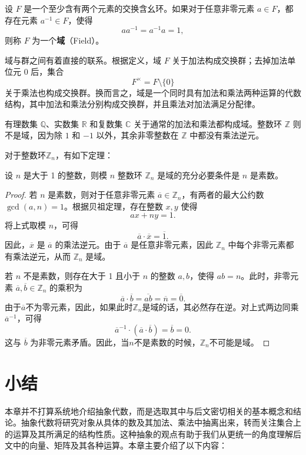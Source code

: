 \begin{definition}[域]
    \label{def_field}
    设 \(F\) 是一个至少含有两个元素的交换含幺环。如果对于任意非零元素 \(a\in F\)，都存在元素 \(a^{-1}\in F\)，使得
    \[
        aa^{-1}=a^{-1}a=1,
    \]
    则称 \(F\) 为一个\textbf{域}（Field）。
\end{definition}

域与群之间有着直接的联系。根据定义，域 \(F\) 关于加法构成交换群；去掉加法单位元 \(0\) 后，集合
\[
    F^\times=F\setminus\{0\}
\]
关于乘法也构成交换群。换而言之，域是一个同时具有加法和乘法两种运算的代数结构，其中加法和乘法分别构成交换群，并且乘法对加法满足分配律。

有理数集 \(\mathbb Q\)、实数集 \(\mathbb R\) 和复数集 \(\mathbb C\) 关于通常的加法和乘法都构成域。整数环 \(\mathbb Z\) 则不是域，因为除 \(1\) 和 \(-1\) 以外，其余非零整数在 \(\mathbb Z\) 中都没有乘法逆元。

对于整数环\( \mathbb{Z}_n \)，有如下定理：
\begin{theorem}
    \label{thm_zn_field_prime}
    设 \(n\) 是大于 1 的整数，则模 \(n\) 整数环 \(\mathbb Z_n\) 是域的充分必要条件是 \(n\) 是素数。
\end{theorem}
\begin{proof}
    若 \(n\) 是素数，则对于任意非零元素 \(\overline a\in\mathbb Z_n\)，有两者的最大公约数 \(\gcd(a,n)=1\)。根据贝祖定理，存在整数 \(x,y\) 使得
    \[
        ax+ny=1.
    \]
    将上式取模 \(n\)，可得
    \[
        \overline{a}\cdot \overline{x}=\overline{1}.
    \]
    因此，\(\overline x\) 是 \(\overline a\) 的乘法逆元。由于 \(\overline a\) 是任意非零元素，因此 \(\mathbb Z_n\) 中每个非零元素都有乘法逆元，从而 \(\mathbb Z_n\) 是域。

    若 \(n\) 不是素数，则存在大于 1 且小于 \(n\) 的整数 \(a,b\)，使得 \(ab=n\)。此时，非零元素 \(\overline a,\overline b\in\mathbb Z_n\) 的乘积为
    \[
        \overline a\cdot \overline b=\overline{ab}=\overline n=\overline 0.
    \]
    由于\( \overline{a} \)不为零元素，因此，如果此时\( \mathbb{Z}_n \)是域的话，其必然存在逆。对上式两边同乘\( \overline{a}^{-1} \)，可得
    \[
        \overline{a}^{-1} \cdot (\overline{a} \cdot \overline{b}) = \overline{b} = 0.
    \]
    这与 \(\overline{b}\) 为非零元素矛盾。因此，当\( n \)不是素数的时候，\( \mathbb{Z}_n \)不可能是域。
\end{proof}


\section{小结}
\label{sec_abstract_summary}
本章并不打算系统地介绍抽象代数，而是选取其中与后文密切相关的基本概念和结论。抽象代数将研究对象从具体的数及其加法、乘法中抽离出来，转而关注集合上的运算及其所满足的结构性质。这种抽象的观点有助于我们从更统一的角度理解后文中的向量、矩阵及其各种运算。本章主要介绍了以下内容：

